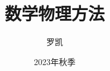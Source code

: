 \documentclass{beamer}
\title{数学物理方法}
\author[罗凯 NJUST]{罗凯}
\institute[*]{南京理工大学理学院\\
kluo@njust.edu.cn}
\date{2023年秋季}
\begin{document}






\begin{frame}
    \titlepage	%
\end{frame}

\begin{frame}[t]
    \tableofcontents
\end{frame}






\end{document}
